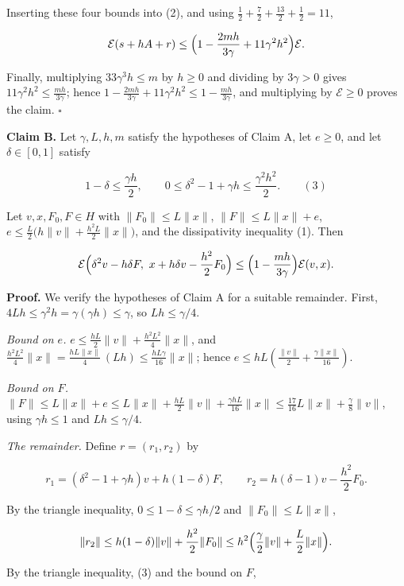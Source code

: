 \documentclass[11pt,a4paper]{article}
\begin{document}
Inserting these four bounds into (2), and using \(\frac12+\frac72+\frac{13}2+\frac12=11\),


\[\mathcal E(s+hA+r)\le\Bigl(1-\frac{2mh}{3\gamma}+11\gamma^2h^2\Bigr)\mathcal E .\]


Finally, multiplying \(33\gamma^3h\le m\) by \(h\ge0\) and dividing by \(3\gamma>0\) gives \(11\gamma^2h^2\le\frac{mh}{3\gamma}\); hence \(1-\frac{2mh}{3\gamma}+11\gamma^2h^2\le1-\frac{mh}{3\gamma}\), and multiplying by \(\mathcal E\ge0\) proves the claim. \(\square\)




\textbf{Claim B.} Let \(\gamma,L,h,m\) satisfy the hypotheses of Claim A, let \(e\ge0\), and let \(\delta\in[0,1]\) satisfy


\[1-\delta\le\frac{\gamma h}2,\qquad0\le\delta^2-1+\gamma h\le\frac{\gamma^2h^2}2 .\qquad(3)\]


Let \(v,x,F_0,F\in H\) with \(\|F_0\|\le L\|x\|\), \(\|F\|\le L\|x\|+e\), \(e\le\frac L2\bigl(h\|v\|+\frac{h^2L}2\|x\|\bigr)\), and the dissipativity inequality (1). Then


\[\mathcal E\Bigl(\delta^2v-h\delta F,\ x+h\delta v-\frac{h^2}2F_0\Bigr)\le\Bigl(1-\frac{mh}{3\gamma}\Bigr)\mathcal E(v,x).\]


\textbf{Proof.} We verify the hypotheses of Claim A for a suitable remainder. First, \(4Lh\le\gamma^2h=\gamma(\gamma h)\le\gamma\), so \(Lh\le\gamma/4\).




\emph{Bound on \(e\).} \(e\le\frac{hL}2\|v\|+\frac{h^2L^2}4\|x\|\), and \(\frac{h^2L^2}4\|x\|=\frac{hL\|x\|}4\,(Lh)\le\frac{hL\gamma}{16}\|x\|\); hence \(e\le hL(\frac{\|v\|}2+\frac{\gamma\|x\|}{16})\).




\emph{Bound on \(F\).} \(\|F\|\le L\|x\|+e\le L\|x\|+\frac{hL}2\|v\|+\frac{\gamma hL}{16}\|x\|\le\frac{17}{16}L\|x\|+\frac\gamma8\|v\|\), using \(\gamma h\le1\) and \(Lh\le\gamma/4\).




\emph{The remainder.} Define \(r=(r_1,r_2)\) by


\[r_1=(\delta^2-1+\gamma h)v+h(1-\delta)F,\qquad r_2=h(\delta-1)v-\frac{h^2}2F_0 .\]


By the triangle inequality, \(0\le1-\delta\le\gamma h/2\) and \(\|F_0\|\le L\|x\|\),


\[\|r_2\|\le h(1-\delta)\|v\|+\frac{h^2}2\|F_0\|\le h^2\Bigl(\frac\gamma2\|v\|+\frac L2\|x\|\Bigr).\]


By the triangle inequality, (3) and the bound on \(F\),
\end{document}
